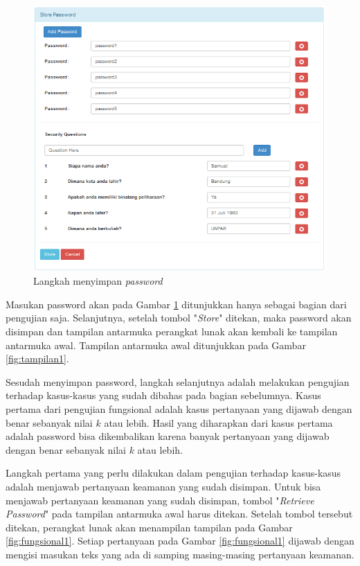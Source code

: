 \begin{figure}[H]
	\includegraphics[scale=0.8]{Gambar/simpan_password}
	\centering
	\caption{Langkah menyimpan \textit{password}}\label{fig:simpan_password}
\end{figure}

Masukan password akan pada Gambar \ref{fig:simpan_password} ditunjukkan hanya sebagai bagian dari pengujian saja. Selanjutnya, setelah tombol "\textit{Store}" ditekan, maka password akan disimpan dan tampilan antarmuka perangkat lunak akan kembali ke tampilan antarmuka awal. Tampilan antarmuka awal ditunjukkan pada Gambar \ref{fig:tampilan1}.

Sesudah menyimpan password, langkah selanjutnya adalah melakukan pengujian terhadap kasus-kasus yang sudah dibahas pada bagian sebelumnya. Kasus pertama dari pengujian fungsional adalah kasus pertanyaan yang dijawab dengan benar sebanyak nilai $k$ atau lebih. Hasil yang diharapkan dari kasus pertama adalah password bisa dikembalikan karena banyak pertanyaan yang dijawab dengan benar sebanyak nilai $k$ atau lebih.

Langkah pertama yang perlu dilakukan dalam pengujian terhadap kasus-kasus adalah menjawab pertanyaan keamanan yang sudah disimpan. Untuk bisa menjawab pertanyaan keamanan yang sudah disimpan, tombol "\textit{Retrieve Password}" pada tampilan antarmuka awal harus ditekan. Setelah tombol tersebut ditekan, perangkat lunak akan menampilan tampilan pada Gambar \ref{fig:fungsional1}. Setiap pertanyaan pada Gambar \ref{fig:fungsional1} dijawab dengan mengisi masukan teks yang ada di samping masing-masing pertanyaan keamanan.


